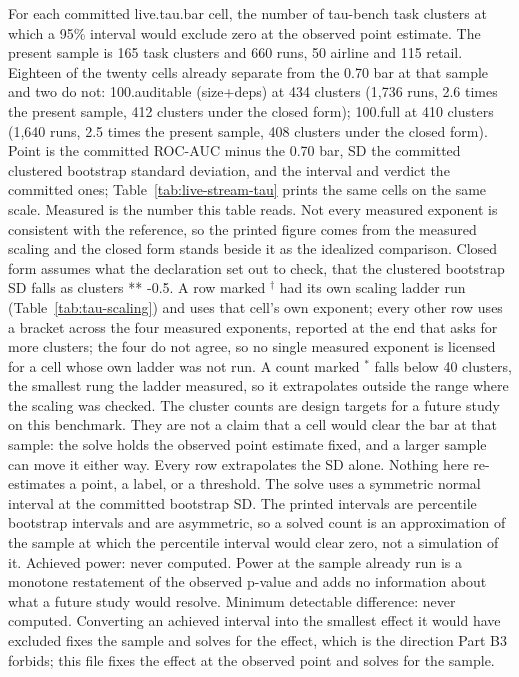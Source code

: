 \begin{table}[t]
\centering
\scriptsize
\setlength{\tabcolsep}{4pt}
\caption{For each committed live.tau.bar cell, the number of tau-bench task clusters at which a 95\% interval would exclude zero at the observed point estimate.
The present sample is 165 task clusters and 660 runs, 50 airline and 115 retail.
Eighteen of the twenty cells already separate from the 0.70 bar at that sample and two do not: 100.auditable (size+deps) at 434 clusters (1,736 runs, 2.6 times the present sample, 412 clusters under the closed form); 100.full at 410 clusters (1,640 runs, 2.5 times the present sample, 408 clusters under the closed form).
Point is the committed ROC-AUC minus the 0.70 bar, SD the committed clustered bootstrap standard deviation, and the interval and verdict the committed ones; Table~\ref{tab:live-stream-tau} prints the same cells on the same scale.
Measured is the number this table reads. Not every measured exponent is consistent with the reference, so the printed figure comes from the measured scaling and the closed form stands beside it as the idealized comparison.
Closed form assumes what the declaration set out to check, that the clustered bootstrap SD falls as clusters ** -0.5.
A row marked $^{\dagger}$ had its own scaling ladder run (Table~\ref{tab:tau-scaling}) and uses that cell's own exponent; every other row uses a bracket across the four measured exponents, reported at the end that asks for more clusters; the four do not agree, so no single measured exponent is licensed for a cell whose own ladder was not run.
A count marked $^{\ast}$ falls below 40 clusters, the smallest rung the ladder measured, so it extrapolates outside the range where the scaling was checked.
The cluster counts are design targets for a future study on this benchmark. They are not a claim that a cell would clear the bar at that sample: the solve holds the observed point estimate fixed, and a larger sample can move it either way.
Every row extrapolates the SD alone. Nothing here re-estimates a point, a label, or a threshold.
The solve uses a symmetric normal interval at the committed bootstrap SD. The printed intervals are percentile bootstrap intervals and are asymmetric, so a solved count is an approximation of the sample at which the percentile interval would clear zero, not a simulation of it.
Achieved power: never computed. Power at the sample already run is a monotone restatement of the observed p-value and adds no information about what a future study would resolve.
Minimum detectable difference: never computed. Converting an achieved interval into the smallest effect it would have excluded fixes the sample and solves for the effect, which is the direction Part B3 forbids; this file fixes the effect at the observed point and solves for the sample.
}
\end{table}
